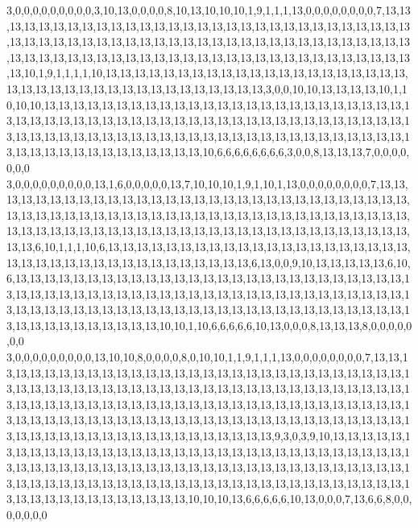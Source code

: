 3,0,0,0,0,0,0,0,0,0,3,10,13,0,0,0,0,8,10,13,10,10,10,1,9,1,1,1,13,0,0,0,0,0,0,0,0,7,13,13,13,13,13,13,13,13,13,13,13,13,13,13,13,13,13,13,13,13,13,13,13,13,13,13,13,13,13,13,13,13,13,13,13,13,13,13,13,13,13,13,13,13,13,13,13,13,13,13,13,13,13,13,13,13,13,13,13,13,13,13,13,13,13,13,13,13,13,13,13,13,13,13,13,13,13,13,13,13,13,13,13,13,13,13,13,10,1,9,1,1,1,1,10,13,13,13,13,13,13,13,13,13,13,13,13,13,13,13,13,13,13,13,13,13,13,13,13,13,13,13,13,13,13,13,13,13,13,13,13,13,13,13,3,0,0,10,10,13,13,13,13,10,1,10,10,10,13,13,13,13,13,13,13,13,13,13,13,13,13,13,13,13,13,13,13,13,13,13,13,13,13,13,13,13,13,13,13,13,13,13,13,13,13,13,13,13,13,13,13,13,13,13,13,13,13,13,13,13,13,13,13,13,13,13,13,13,13,13,13,13,13,13,13,13,13,13,13,13,13,13,13,13,13,13,13,13,13,13,13,13,13,13,13,13,13,13,13,13,13,13,13,10,6,6,6,6,6,6,6,6,3,0,0,8,13,13,13,7,0,0,0,0,0,0,0
3,0,0,0,0,0,0,0,0,0,13,1,6,0,0,0,0,0,13,7,10,10,10,1,9,1,10,1,13,0,0,0,0,0,0,0,0,7,13,13,13,13,13,13,13,13,13,13,13,13,13,13,13,13,13,13,13,13,13,13,13,13,13,13,13,13,13,13,13,13,13,13,13,13,13,13,13,13,13,13,13,13,13,13,13,13,13,13,13,13,13,13,13,13,13,13,13,13,13,13,13,13,13,13,13,13,13,13,13,13,13,13,13,13,13,13,13,13,13,13,13,13,13,13,13,13,6,10,1,1,1,10,6,13,13,13,13,13,13,13,13,13,13,13,13,13,13,13,13,13,13,13,13,13,13,13,13,13,13,13,13,13,13,13,13,13,13,13,13,13,13,6,13,0,0,9,10,13,13,13,13,13,6,10,6,13,13,13,13,13,13,13,13,13,13,13,13,13,13,13,13,13,13,13,13,13,13,13,13,13,13,13,13,13,13,13,13,13,13,13,13,13,13,13,13,13,13,13,13,13,13,13,13,13,13,13,13,13,13,13,13,13,13,13,13,13,13,13,13,13,13,13,13,13,13,13,13,13,13,13,13,13,13,13,13,13,13,13,13,13,13,13,13,13,13,13,13,13,13,10,10,1,10,6,6,6,6,6,10,13,0,0,0,8,13,13,13,8,0,0,0,0,0,0,0
3,0,0,0,0,0,0,0,0,0,13,10,10,8,0,0,0,0,8,0,10,10,1,1,9,1,1,1,13,0,0,0,0,0,0,0,0,7,13,13,13,13,13,13,13,13,13,13,13,13,13,13,13,13,13,13,13,13,13,13,13,13,13,13,13,13,13,13,13,13,13,13,13,13,13,13,13,13,13,13,13,13,13,13,13,13,13,13,13,13,13,13,13,13,13,13,13,13,13,13,13,13,13,13,13,13,13,13,13,13,13,13,13,13,13,13,13,13,13,13,13,13,13,13,13,13,13,13,13,13,13,13,13,13,13,13,13,13,13,13,13,13,13,13,13,13,13,13,13,13,13,13,13,13,13,13,13,13,13,13,13,13,13,13,13,13,13,13,13,13,13,9,3,0,3,9,10,13,13,13,13,13,13,13,13,13,13,13,13,13,13,13,13,13,13,13,13,13,13,13,13,13,13,13,13,13,13,13,13,13,13,13,13,13,13,13,13,13,13,13,13,13,13,13,13,13,13,13,13,13,13,13,13,13,13,13,13,13,13,13,13,13,13,13,13,13,13,13,13,13,13,13,13,13,13,13,13,13,13,13,13,13,13,13,13,13,13,13,13,13,13,13,13,13,13,13,13,13,13,10,10,10,13,6,6,6,6,6,10,13,0,0,0,7,13,6,6,8,0,0,0,0,0,0,0
